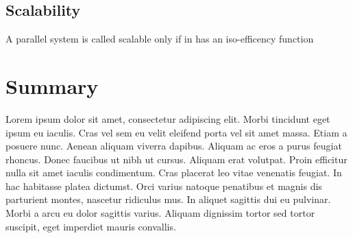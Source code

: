 \subsection{Scalability}
	A parallel system is called scalable only if in has an iso-efficency function
%
%
%
%
%
\section{Summary}
Lorem ipsum dolor sit amet, consectetur adipiscing elit. Morbi tincidunt eget
ipsum eu iaculis. Cras vel sem eu velit eleifend porta vel sit amet massa. Etiam
a posuere nunc. Aenean aliquam viverra dapibus. Aliquam ac eros a purus feugiat
rhoncus. Donec faucibus ut nibh ut cursus. Aliquam erat volutpat. Proin efficitur
nulla sit amet iaculis condimentum. Cras placerat leo vitae venenatis feugiat. In
hac habitasse platea dictumst. Orci varius natoque penatibus et magnis dis
parturient montes, nascetur ridiculus mus. In aliquet sagittis dui eu pulvinar.
Morbi a arcu eu dolor sagittis varius. Aliquam dignissim tortor sed tortor
suscipit, eget imperdiet mauris convallis.
